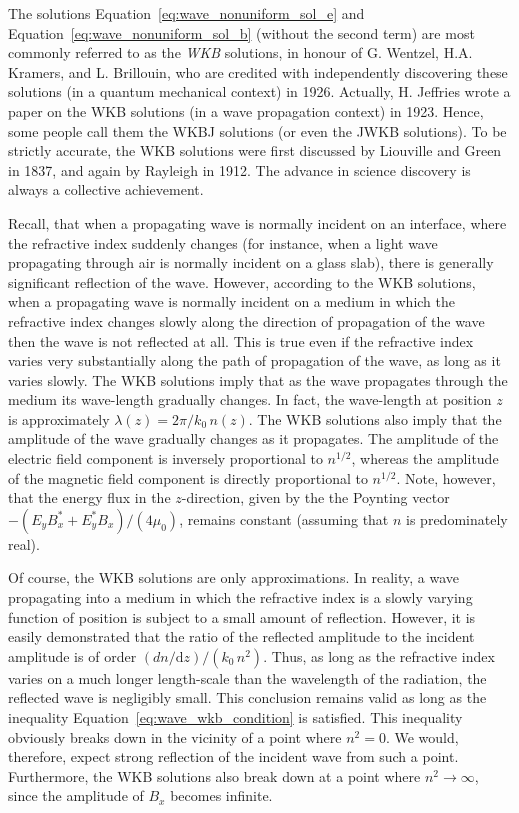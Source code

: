 \documentclass[
  notoc %
]{tufte-book}
\begin{document}
The solutions Equation~\ref{eq:wave_nonuniform_sol_e} and
Equation~\ref{eq:wave_nonuniform_sol_b} (without the second term) are
most commonly referred to as the \emph{WKB} solutions, in honour of G.
Wentzel, H.A. Kramers, and L. Brillouin, who are credited with
independently discovering these solutions (in a quantum mechanical
context) in 1926. Actually, H. Jeffries wrote a paper on the WKB
solutions (in a wave propagation context) in 1923. Hence, some people
call them the WKBJ solutions (or even the JWKB solutions). To be
strictly accurate, the WKB solutions were first discussed by Liouville
and Green in 1837, and again by Rayleigh in 1912. The advance in science
discovery is always a collective achievement.

Recall, that when a propagating wave is normally incident on an
interface, where the refractive index suddenly changes (for instance,
when a light wave propagating through air is normally incident on a
glass slab), there is generally significant reflection of the wave.
However, according to the WKB solutions, when a propagating wave is
normally incident on a medium in which the refractive index changes
slowly along the direction of propagation of the wave then the wave is
not reflected at all. This is true even if the refractive index varies
very substantially along the path of propagation of the wave, as long as
it varies slowly. The WKB solutions imply that as the wave propagates
through the medium its wave-length gradually changes. In fact, the
wave-length at position \(z\) is approximately
\(\lambda(z)= 2\pi/ k_0\,n(z)\). The WKB solutions also imply that the
amplitude of the wave gradually changes as it propagates. The amplitude
of the electric field component is inversely proportional to
\(n^{1/2}\), whereas the amplitude of the magnetic field component is
directly proportional to \(n^{1/2}\). Note, however, that the energy
flux in the \(z\)-direction, given by the the Poynting vector
\(-(E_y B_x^\ast +E_y^\ast B_x)/(4\mu_0)\), remains constant (assuming
that \(n\) is predominately real).

Of course, the WKB solutions are only approximations. In reality, a wave
propagating into a medium in which the refractive index is a slowly
varying function of position is subject to a small amount of reflection.
However, it is easily demonstrated that the ratio of the reflected
amplitude to the incident amplitude is of order
\((dn/\mathrm{d}z)/(k_0\,n^2)\). Thus, as long as the refractive index
varies on a much longer length-scale than the wavelength of the
radiation, the reflected wave is negligibly small. This conclusion
remains valid as long as the inequality
Equation~\ref{eq:wave_wkb_condition} is satisfied. This inequality
obviously breaks down in the vicinity of a point where \(n^2=0\). We
would, therefore, expect strong reflection of the incident wave from
such a point. Furthermore, the WKB solutions also break down at a point
where \(n^2\rightarrow\infty\), since the amplitude of \(B_x\) becomes
infinite.
\end{document}
